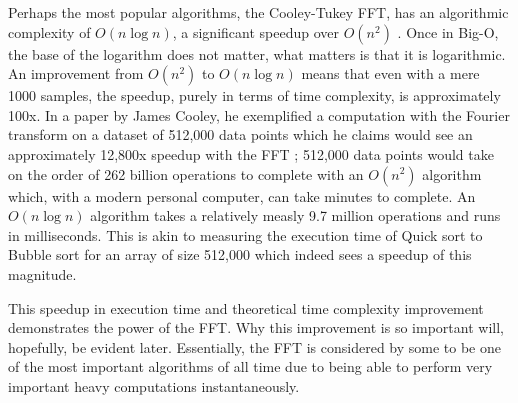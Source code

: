 Perhaps the most popular algorithms, the Cooley-Tukey FFT, has an algorithmic complexity of $O(n \log n)$, a significant speedup over $O(n^2)$ \cite{Randhawa2018} \cite{HeidemanEtAl1984}. Once in Big-O, the base of the logarithm does not matter, what matters is that it is logarithmic. An improvement from $O(n^2)$ to $O(n \log n)$ means that even with a mere 1000 samples, the speedup, purely in terms of time complexity, is approximately 100x. In a paper by James Cooley, he exemplified a computation with the Fourier transform on a dataset of 512,000 data points which he claims would see an approximately 12,800x speedup with the FFT \cite{Cooley1987}; 512,000 data points would take on the order of 262 billion operations to complete with an $O(n^2)$ algorithm which, with a modern personal computer, can take minutes to complete. An $O(n \log n)$ algorithm takes a relatively measly 9.7 million operations and runs in milliseconds. This is akin to measuring the execution time of Quick sort to Bubble sort for an array of size 512,000 which indeed sees a speedup of this magnitude.

This speedup in execution time and theoretical time complexity improvement demonstrates the power of the FFT. Why this improvement is so important will, hopefully, be evident later. Essentially, the FFT is considered by some to be one of the most important algorithms of all time due to being able to perform very important heavy computations instantaneously. 


